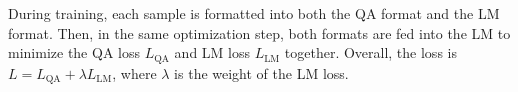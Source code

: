\documentclass{article} %
\begin{document}
During training, each sample is formatted into both the QA format and the LM format.
Then, in the same optimization step, both formats are fed into the LM to minimize the QA loss $L_{\text{QA}}$ and LM loss $L_{\text{LM}}$ together. Overall, the loss is $L = L_{\text{QA}} + \lambda L_{\text{LM}}$, where $\lambda$ is the weight of the LM loss.







\end{document}
